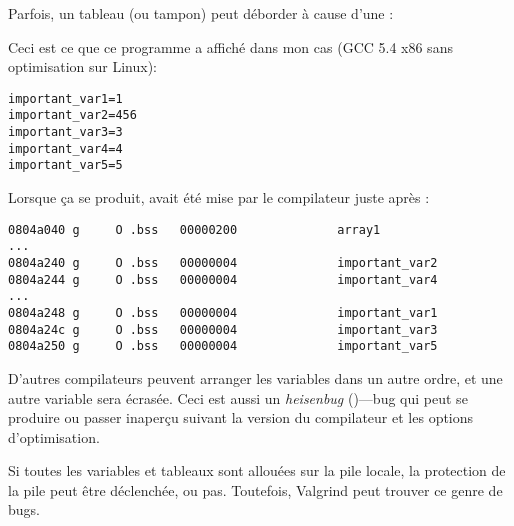 \label{GlobalArraysOverflowHeisenbug}

Parfois, un tableau (ou tampon) peut déborder à cause d'une :



Ceci est ce que ce programme a affiché dans mon cas (GCC 5.4 x86 sans optimisation sur Linux):

\begin{lstlisting}
important_var1=1
important_var2=456
important_var3=3
important_var4=4
important_var5=5
\end{lstlisting}

Lorsque ça se produit,  avait été mise par le compilateur juste
après :

\begin{lstlisting}[caption=objdump -x]
0804a040 g     O .bss   00000200              array1
...
0804a240 g     O .bss   00000004              important_var2
0804a244 g     O .bss   00000004              important_var4
...
0804a248 g     O .bss   00000004              important_var1
0804a24c g     O .bss   00000004              important_var3
0804a250 g     O .bss   00000004              important_var5
\end{lstlisting}

D'autres compilateurs peuvent arranger les variables dans un autre ordre, et une autre
variable sera écrasée.
Ceci est aussi un \textit{heisenbug} ()---bug qui peut se produire
ou passer inaperçu suivant la version du compilateur et les options d'optimisation.

Si toutes les variables et tableaux sont allouées sur la pile locale, la protection
de la pile peut être déclenchée, ou pas.
Toutefois, Valgrind peut trouver ce genre de bugs.


